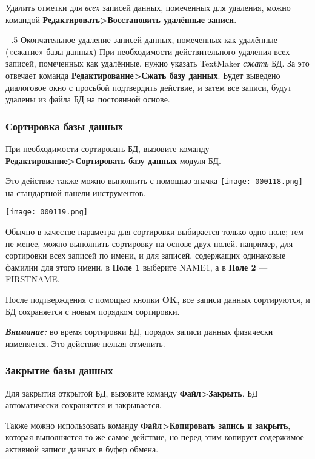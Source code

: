 ﻿\documentclass[a4paper,10pt]{article}
\makeatletter
\renewcommand\paragraph{%
   \@startsection{paragraph}{4}{0mm}%
      {-\baselineskip}%
      {.5\baselineskip}%
      {\normalfont\normalsize\bfseries}}
\makeatother
\begin{document}
Удалить отметки для \textit{всех} записей данных, помеченных для удаления, можно командой \textbf{Редактировать>Восстановить удалённые записи}.

\paragraph{Окончательное удаление записей данных, помеченных как удалённые («сжатие» базы данных)}
При необходимости действительного удаления всех записей, помеченных как удалённые, нужно указать TextMaker \textit{сжать} БД. За это отвечает команда \textbf{Редактирование>Сжать базу данных}. Будет выведено диалоговое окно с просьбой подтвердить действие, и затем все записи, будут удалены из файла БД на постоянной основе.

\subsubsection{Сортировка базы данных}
При необходимости сортировать БД, вызовите команду \textbf{Редактирование>Сортировать базу данных} модуля БД.

Это действие также можно выполнить с помощью значка \texttt{[image: 000118.png]} на стандартной панели инструментов.

\texttt{[image: 000119.png]}

Обычно в качестве параметра для сортировки выбирается только одно  поле; тем не менее, можно выполнить сортировку на основе двух полей. например, для сортировки всех записей по имени, и для записей, содержащих одинаковые фамилии для этого имени, в \textbf{Поле 1} выберите NAME1, а в \textbf{Поле 2} — FIRSTNAME.

После подтверждения с помощью кнопки \textbf{OK}, все записи данных сортируются, и БД сохраняется с новым порядком сортировки.

\begin{mdframed}[backgroundcolor=blue!10]
\textbf{\textit{Внимание:}} во время сортировки БД, порядок записи данных физически изменяется. Это действие нельзя отменить.
\end{mdframed}

\subsubsection{Закрытие базы данных}
Для закрытия открытой БД, вызовите команду \textbf{Файл>Закрыть}. БД автоматически сохраняется и закрывается.

Также можно использовать команду \textbf{Файл>Копировать запись и закрыть}, которая выполняется то же самое действие, но перед этим копирует содержимое активной записи данных в буфер обмена.
\end{document}
